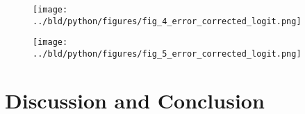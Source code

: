 \documentclass[11pt]{article}
\begin{document}
\pagebreak

\begin{figure}[h!]
    \centering
    \texttt{[image: ../bld/python/figures/fig\_4\_error\_corrected\_logit.png]}
    \caption{}
    \label{fig:logistic_regression}
    \end{figure}

\pagebreak

\begin{figure}[h!]
    \centering
    \texttt{[image: ../bld/python/figures/fig\_5\_error\_corrected\_logit.png]}
    \caption{}
    \label{fig:logistic_regression}
    \end{figure}

\pagebreak

\hypertarget{Discussion and Conclusion}{%
\section{Discussion and Conclusion}\label{Discussion and Conclusion}}



\end{document}
